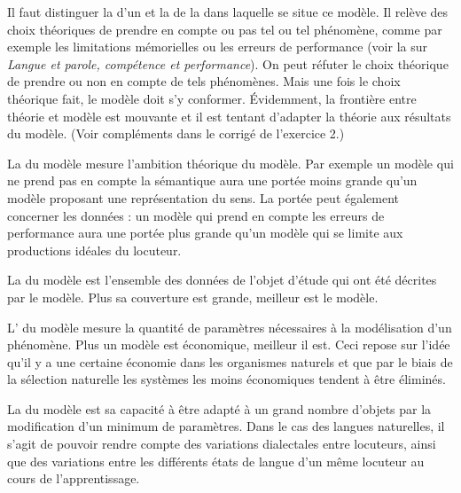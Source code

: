 Il faut distinguer la  d’un  et la  de la  dans laquelle se situe ce modèle. Il relève des choix théoriques de prendre en compte ou pas tel ou tel phénomène, comme par exemple les limitations mémorielles ou les erreurs de performance (voir la  sur \textit{Langue et parole, compétence et performance}). On peut réfuter le choix théorique de prendre ou non en compte de tels phénomènes. Mais une fois le choix théorique fait, le modèle doit s’y conformer. Évidemment, la frontière entre théorie et modèle est mouvante et il est tentant d’adapter la théorie aux résultats du modèle. (Voir compléments dans le corrigé de l’exercice 2.)

La  du modèle mesure l’ambition théorique du modèle. Par exemple un modèle qui ne prend pas en compte la sémantique aura une portée moins grande qu’un modèle proposant une représentation du sens. La portée peut également concerner les données : un modèle qui prend en compte les erreurs de performance aura une portée plus grande qu’un modèle qui se limite aux productions idéales du locuteur.

La  du modèle est l’ensemble des données de l’objet d’étude qui ont été décrites par le modèle. Plus sa couverture est grande, meilleur est le modèle.

L’ du modèle mesure la quantité de paramètres nécessaires à la modélisation d’un phénomène. Plus un modèle est économique, meilleur il est. Ceci repose sur l’idée qu’il y a une certaine économie dans les organismes naturels et que par le biais de la sélection naturelle les systèmes les moins économiques tendent à être éliminés.

La  du modèle est sa capacité à être adapté à un grand nombre d’objets par la modification d’un minimum de paramètres. Dans le cas des langues naturelles, il s’agit de pouvoir rendre compte des variations dialectales entre locuteurs, ainsi que des variations entre les différents états de langue d’un même locuteur au cours de l’apprentissage.


